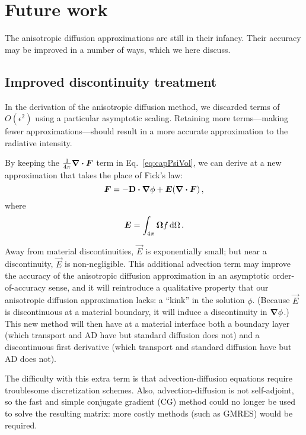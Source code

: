 \section{Future work}

The anisotropic diffusion approximations are still in their infancy. Their
accuracy may be improved in a number of ways, which we here discuss.

\subsection{Improved discontinuity treatment}

In the derivation of the anisotropic diffusion method, we discarded
terms of $O(\epsilon^2)$ using a particular asymptotic scaling. Retaining more
terms---making fewer approximations---should result in a more accurate
approximation to the radiative intensity.

By keeping the $\frac{1}{4\pi} \bm{\nabla} \bm{\cdot} \bm{F}$ term in
Eq.~\eqref{eq:capPsiVol}, we can derive at a new approximation that takes the place
of Fick's law:
\begin{equation*}
  \bm{F} = - \mathbf{D} \bm{\cdot} \bm{\nabla} \phi + \bm{E} (\bm{\nabla} \bm{\cdot}\bm{F})\,,
\end{equation*}
where
\begin{equation*}
  \bm{E} = \int_{4\pi} \bm{\Omega} f \mathop{}\!\mathrm{d}\Omega\,.
\end{equation*}

Away from material discontinuities, $\vec{E}$ is exponentially small; but
near a discontinuity, $\vec{E}$ is non-negligible. This additional advection
term may
improve the accuracy of the anisotropic diffusion approximation in an
asymptotic order-of-accuracy sense, and it will reintroduce a qualitative
property that our anisotropic
diffusion approximation lacks: a ``kink'' in the solution $\phi$. (Because
$\vec{E}$ is discontinuous at a material boundary, it will induce a
discontinuity in $\bm{\nabla} \phi$.) This new method will then have at a material
interface both a boundary layer (which transport and AD have but standard
diffusion does not) and a discontinuous first derivative (which transport and
standard diffusion have but AD does not).

The difficulty with this extra term is that advection-diffusion equations
require troublesome discretization schemes. Also, advection-diffusion is
not self-adjoint,
so the fast and simple conjugate gradient (CG) method could no longer be used to
solve the resulting matrix: more costly methods (such as GMRES) would be
required.

